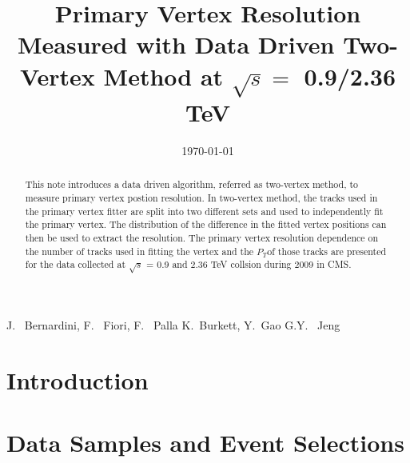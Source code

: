 \documentclass{cmspaper}
\newcommand{\pt} {\ensuremath{P_T}}
\begin{document}
%
\begin{titlepage}
\date{\today}

\title{Primary Vertex Resolution Measured with Data Driven Two-Vertex Method at $\sqrt{s} = $ 0.9/2.36 TeV}

  \begin{Authlist}
    J.~ Bernardini, F.~ Fiori, F.~ Palla
    K.~Burkett, Y.~Gao
    G.Y.~ Jeng

  \end{Authlist}

\begin{abstract}

This note introduces a data driven algorithm, referred as two-vertex method, 
to measure primary vertex postion resolution. 
In two-vertex method, the tracks used in the primary vertex fitter 
are split into two different sets and used to independently
fit the primary vertex. The distribution of the difference in the
fitted vertex positions can then be used to extract the resolution. 
The primary vertex resolution dependence on the number of tracks used 
in fitting the vertex and the \pt of those tracks are 
presented for the data collected at $\sqrt{s}$ = 0.9 and 2.36 TeV collsion 
during 2009 in CMS.

\end{abstract}
\end{titlepage}

\setcounter{page}{2}%
\tableofcontents
\pagebreak


\section {Introduction}
\label{sec:intro}


\section{Data Samples and Event Selections}
\label{sec:datasample}


\end{document}
